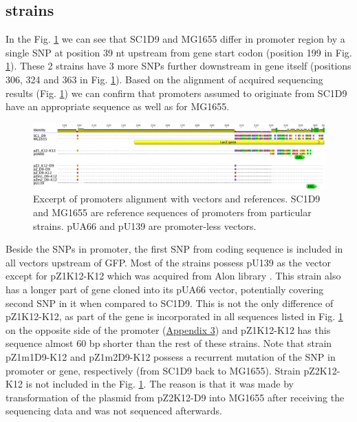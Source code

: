 \hypertarget{SeqRes}{\subsection{ strains}}
In the Fig. \ref{placZ} we can see that SC1\textunderscore D9 and MG1655 differ in  promoter region by a single SNP at position 39 nt upstream from  gene start codon (position 199 in Fig. \ref{placZ}).
These 2 strains have 3 more SNPs further downstream in  gene itself 
(positions 306, 324 and 363 in Fig. \ref{placZ}).
Based on the alignment of acquired sequencing results (Fig. \ref{placZ}) we can confirm that  promoters assumed to originate from SC1\textunderscore D9 have an appropriate sequence as well as for MG1655.
\begin{figure}[b]
  \centering
  \includegraphics[scale=0.25]{text/Pictures/placZsequences.png}
    \caption{Excerpt of  promoters alignment with vectors and references. SC1\textunderscore D9 and MG1655 are reference sequences of  promoters from particular strains. pUA66 and pU139 are promoter-less vectors.}
    \label{placZ}
\end{figure}
Beside the SNPs in  promoter, the first SNP from  coding sequence is included in all vectors upstream of GFP.
Most of the strains possess pU139 as the vector except for pZ1\textunderscore K12-K12 which was acquired from Alon library \cite{zaslaver2006comprehensive}.
This strain also has a longer part of  gene cloned into its pUA66 vector, potentially covering second SNP in it when compared to SC1\textunderscore D9.
This is not the only difference of pZ1\textunderscore K12-K12, as part of the  gene is incorporated in all sequences listed in Fig. \ref{placZ} on the opposite side of the promoter (\hyperlink{placZalign}{Appendix 3}) and pZ1\textunderscore K12-K12 has this  sequence almost 60 bp shorter than the rest of these strains.
Note that strain pZ1m1\textunderscore D9-K12 and pZ1m2\textunderscore D9-K12 possess a recurrent mutation of the SNP in  promoter or  gene, respectively (from SC1\textunderscore D9 back to MG1655).
Strain pZ2\textunderscore K12-K12 is not included in the Fig. \ref{placZ}.
The reason is that it was made by transformation of the plasmid from pZ2\textunderscore K12-D9 into MG1655 after receiving the sequencing data and was not sequenced afterwards.

